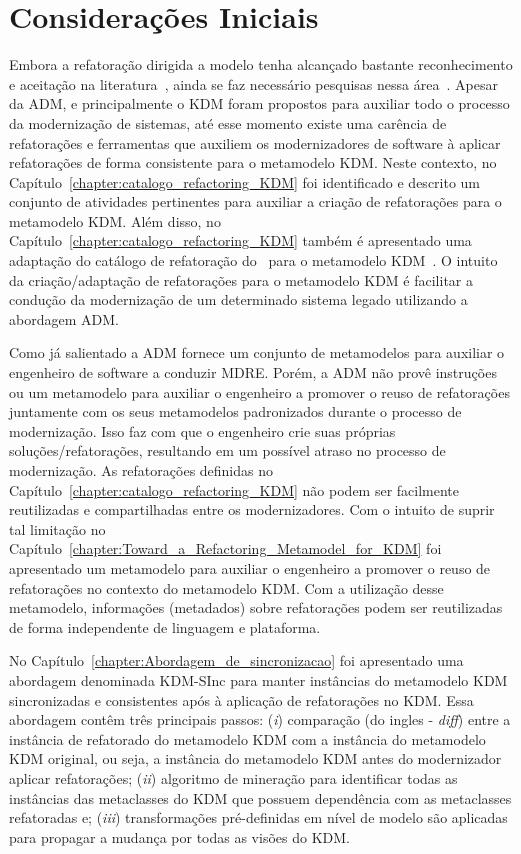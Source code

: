 \section{Considerações Iniciais}

Embora a refatoração dirigida a modelo tenha alcançado bastante reconhecimento e aceitação na literatura~\cite{Moghadam_2012,Maneerat_2011,Fourati_2011,Einarsson_2012,Steimann_2015,Akiyama_2011, Jensen_2010,Arendt_2012,Millan_2009,Tom_2008_2008}, ainda se faz necessário pesquisas nessa área~\cite{durelli_systematic_mapping, revisao_sistematica_uml_refactoring}.
Apesar da ADM, e principalmente o KDM foram propostos para auxiliar todo o processo da modernização de sistemas, até esse momento existe uma carência de refatorações e ferramentas que auxiliem os modernizadores de software à aplicar refatorações de forma consistente para o metamodelo KDM. Neste contexto, no Capítulo~\ref{chapter:catalogo_refactoring_KDM} foi identificado e descrito um conjunto de atividades pertinentes para auxiliar a criação de refatorações para o metamodelo KDM. Além disso, no Capítulo~\ref{chapter:catalogo_refactoring_KDM} também é apresentado uma adaptação do catálogo de refatoração do~ para o metamodelo KDM~\cite{durelli_catalogo}. O intuito da criação/adaptação de refatorações para o metamodelo KDM é facilitar a condução da modernização de um determinado sistema legado utilizando a abordagem ADM.


Como já salientado a ADM fornece um conjunto de metamodelos para auxiliar o engenheiro de software a conduzir MDRE. Porém, a ADM não provê instruções ou um metamodelo para auxiliar o engenheiro a promover o reuso de refatorações juntamente com os seus metamodelos padronizados durante o processo de modernização. 
Isso faz com que o engenheiro crie suas próprias soluções/refatorações, resultando em um possível atraso no processo de modernização. As refatorações definidas no Capítulo~\ref{chapter:catalogo_refactoring_KDM} não podem ser facilmente reutilizadas e compartilhadas entre os modernizadores. Com o intuito de suprir tal limitação no Capítulo~\ref{chapter:Toward_a_Refactoring_Metamodel_for_KDM} foi apresentado um metamodelo para auxiliar o engenheiro a promover o reuso de refatorações no contexto do metamodelo KDM. Com a utilização desse metamodelo, informações (metadados) sobre refatorações podem ser reutilizadas de forma independente de linguagem e plataforma. 

No Capítulo~\ref{chapter:Abordagem_de_sincronizacao} foi apresentado uma abordagem denominada KDM-SInc para manter instâncias do metamodelo KDM sincronizadas e consistentes após à aplicação de refatorações no KDM. Essa abordagem contêm três principais passos: (\textit{i}) comparação (do ingles - \textit{diff}) entre a instância de refatorado do metamodelo KDM com a instância do metamodelo KDM original, ou seja, a instância do metamodelo KDM antes do modernizador aplicar refatorações; (\textit{ii}) algoritmo de mineração para identificar todas as instâncias das metaclasses do KDM que possuem dependência com as metaclasses refatoradas e; (\textit{iii}) transformações pré-definidas em nível de modelo são aplicadas para propagar a mudança por todas as visões do KDM.

